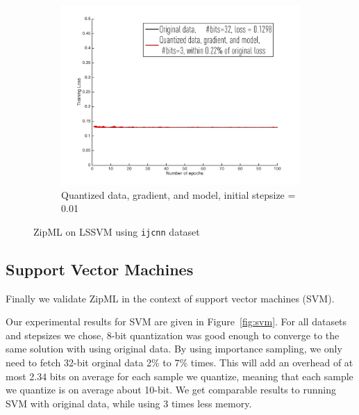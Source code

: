 \documentclass{article}
\begin{document}
\begin{figure}[h]
\begin{subfigure}[h]{.3\columnwidth}
    \includegraphics[width=\columnwidth]{lssvm/ijcnn/dgm001}
     \caption{Quantized data, gradient, and model, initial stepsize = 0.01}
    \end{subfigure}
    
\caption{ZipML on LSSVM using \texttt{ijcnn} dataset}
\label{fig:lssvmijcnn}
\end{figure}



\subsection{Support Vector Machines}
\label{sec:svm}

Finally we validate ZipML in the context of support vector machines (SVM).

Our experimental results for SVM are given in Figure~\ref{fig:svm}. For all datasets and stepsizes we chose, 8-bit quantization was good enough to converge to the same solution with using original data. By using importance sampling, we only need to fetch 32-bit orginal data 2\% to 7\% times. This will add an overhead of at most 2.34 bits on average for each sample we quantize, meaning that each sample we quantize is on average about 10-bit. We get comparable results to running SVM with original data, while using 3 times less memory.%
\end{document}
